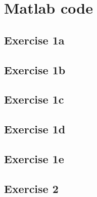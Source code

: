 \chapter{Matlab code}

	\section{Exercise 1a}
	\label{app:1a}
	

	\section{Exercise 1b}
	\label{app:1b}
	

	\section{Exercise 1c}
	\label{app:1c}
	
	\clearpage
	
	\section{Exercise 1d}
	\label{app:1d}
	

	\section{Exercise 1e}
	\label{app:1e}
	

	\section{Exercise 2}
	\label{app:2}
	
